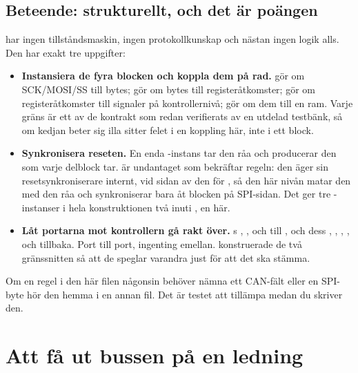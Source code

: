 \subsection*{Beteende: strukturellt, och det är poängen}
 har ingen tillståndsmaskin, ingen protokollkunskap och nästan ingen logik alls.
Den har exakt tre uppgifter:
\begin{itemize}
  \item \textbf{Instansiera de fyra blocken och koppla dem på rad.}  gör om
    SCK/MOSI/SS till bytes;  gör om bytes till registeråtkomster;
     gör om registeråtkomster till signaler på kontrollernivå;
     gör om dem till en ram. Varje gräns är ett av de kontrakt som redan
    verifierats av en utdelad testbänk, så om kedjan beter sig illa sitter felet i en koppling här,
    inte i ett block.
  \item \textbf{Synkronisera reseten.} En enda -instans tar den råa 
    och producerar den  som varje delblock tar.  är undantaget
    som bekräftar regeln: den äger sin resetsynkroniserare internt, vid sidan av den för
    , så den här nivån matar den med den råa  och synkroniserar bara åt
    blocken på SPI-sidan. Det ger tre -instanser i hela konstruktionen \textemdash{}
    två inuti , en här.
  \item \textbf{Låt portarna mot kontrollern gå rakt över.} s ,
    ,  och  till , och dess
    , , , ,  och 
    tillbaka. Port till port, ingenting emellan.  konstruerade de två gränssnitten så
    att de speglar varandra just för att det ska stämma.
\end{itemize}

Om en regel i den här filen någonsin behöver nämna ett CAN-fält eller en SPI-byte hör den hemma i en
annan fil. Det är testet att tillämpa medan du skriver den.

\section{Att få ut bussen på en ledning}
\label{c19:sec:wire}

